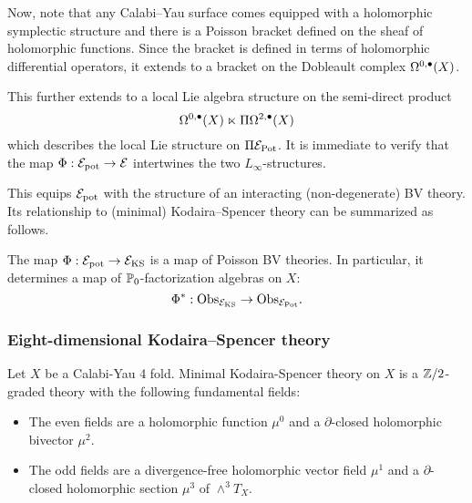 \documentclass[11pt]{amsart}
\begin{document}
Now, note that any Calabi--Yau surface comes equipped with a holomorphic symplectic structure and there is a Poisson bracket defined on the sheaf of holomorphic functions.
Since the bracket is defined in terms of holomorphic differential operators, it extends to a bracket on the Dobleault complex $\Omega^{0,\bullet}(X)$.

This further extends to a local Lie algebra structure on the semi-direct product
\[
\Omega^{0,\bullet}(X) \ltimes \Pi \Omega^{2,\bullet}(X)
\]
which describes the local Lie structure on $\Pi \mathcal E_{\rm Pot}$.
It is immediate to verify that the map $\Phi : \mathcal E_{\rm pot} \to \mathcal E$ intertwines the two $L_\infty$-structures.

This equips $\mathcal E_{\rm pot}$ with the structure of an interacting (non-degenerate) BV theory.
Its relationship to (minimal) Kodaira--Spencer theory can be summarized as follows.

\begin{prop}
  The map $\Phi : \mathcal E_{\rm pot} \to \mathcal E_{\rm KS}$ is a map of Poisson BV theories.
  In particular, it determines a map of $\mathbb P_0$-factorization algebras on $X$:
\[
\Phi^* : {\rm Obs}_{\mathcal E_{\rm KS}} \to {\rm Obs}_{\mathcal E_{\rm Pot}} .
\]
\end{prop}

\subsubsection{Eight-dimensional Kodaira--Spencer theory}
\label{sec:orgeb2dd4d}

Let \(X\) be a Calabi-Yau 4 fold. Minimal Kodaira-Spencer theory on $X$ is a $\mathbb Z/2$-graded theory with the following fundamental fields:
\begin{itemize}
\item The even fields are a holomorphic function $\mu^0$ and a $\partial$-closed holomorphic bivector $\mu^2$.
\item The odd fields are a divergence-free holomorphic vector field $\mu^1$ and a $\partial$-closed holomorphic section $\mu^3$ of $\wedge^3 T_X$.
\end{itemize}
\end{document}
